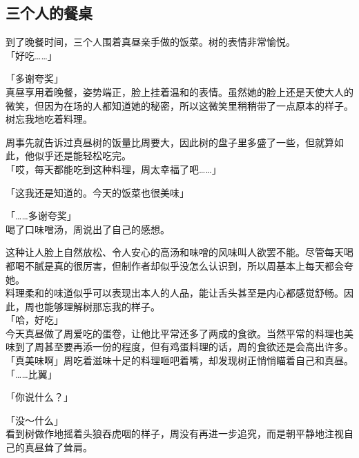 \subsection{三个人的餐桌}

到了晚餐时间，三个人围着真昼亲手做的饭菜。树的表情非常愉悦。\\

「好吃……」

「多谢夸奖」\\

真昼享用着晚餐，姿势端正，脸上挂着温和的表情。虽然她的脸上还是天使大人的微笑，但因为在场的人都知道她的秘密，所以这微笑里稍稍带了一点原本的样子。\\

树忘我地吃着料理。

周事先就告诉过真昼树的饭量比周要大，因此树的盘子里多盛了一些，但就算如此，他似乎还是能轻松吃完。\\

「哎，每天都能吃到这种料理，周太幸福了吧……」

「这我还是知道的。今天的饭菜也很美味」

「……多谢夸奖」\\

喝了口味噌汤，周说出了自己的感想。

这种让人脸上自然放松、令人安心的高汤和味噌的风味叫人欲罢不能。尽管每天喝都喝不腻是真的很厉害，但制作者却似乎没怎么认识到，所以周基本上每天都会夸她。\\

料理柔和的味道似乎可以表现出本人的人品，能让舌头甚至是内心都感觉舒畅。因此，周也能够理解树那忘我的样子。\\

「哈，好吃」\\

今天真昼做了周爱吃的蛋卷，让他比平常还多了两成的食欲。当然平常的料理也美味到了周甚至要再添一份的程度，但有鸡蛋料理的话，周的食欲还是会高出许多。\\

「真美味啊」周吃着滋味十足的料理咂吧着嘴，却发现树正悄悄瞄着自己和真昼。\\

「……比翼」

「你说什么？」

「没～什么」\\

看到树做作地摇着头狼吞虎咽的样子，周没有再进一步追究，而是朝平静地注视自己的真昼耸了耸肩。\\

